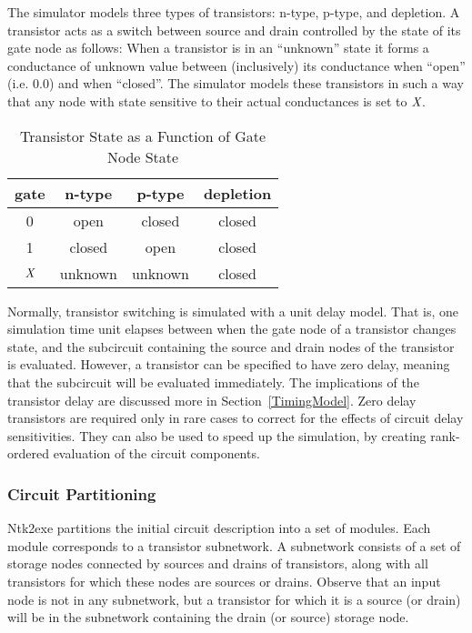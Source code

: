 The simulator models three types of transistors: n-type, p-type, and depletion.
A transistor acts as a switch between source and drain controlled by
the state of its gate node as follows: When a transistor is in an ``unknown''
state it forms a conductance of unknown value between (inclusively) its
conductance when ``open'' (i.e. 0.0) and when ``closed''.
The simulator models these transistors in such a way that any node
with state sensitive to their actual conductances is set to $\mbox{\em X}$.

\begin{table}[htbp]
\begin{center}
\begin{tabular}{|c|c|c|c|} \hline
gate  & n-type &p-type &depletion \\ \hline
0     & open   &closed &closed \\ \hline
1     & closed &open   &closed \\ \hline
$\mbox{\em X}$     & unknown&unknown&closed \\ \hline
\end{tabular}
\label{TransFun}
\caption{Transistor State as a Function of Gate Node State}
\end{center}
\end{table}

Normally, transistor switching is simulated with a unit delay model.
That is, one simulation time unit elapses between when the gate node of
a transistor changes state, and the subcircuit containing the source
and drain nodes of the transistor is evaluated.
However, a transistor can be specified to have zero delay, meaning
that the subcircuit will be evaluated immediately.
The implications of the transistor delay are discussed more in
Section~\ref{TimingModel}.
Zero delay transistors are required only in rare cases
to correct for the effects of circuit delay sensitivities.
They can also be used to speed up the simulation, by
creating rank-ordered evaluation of the circuit components.

\subsubsection{Circuit Partitioning}


Ntk2exe partitions the initial circuit description into a set of modules.
Each module corresponds to a transistor subnetwork.
A subnetwork consists of a set of storage nodes connected by sources and drains
of transistors, along with all transistors for which these nodes are
sources or drains.
Observe that an input node is not in any subnetwork, but a transistor for
which it is a source (or drain) will be in the subnetwork containing the
drain (or source) storage node.

